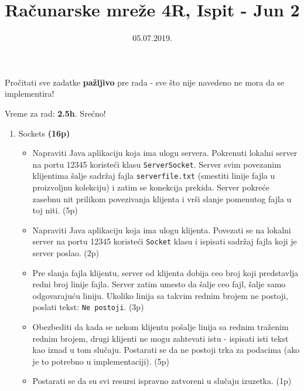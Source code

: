 \documentclass[]{article}
\title{Ra\v{c}unarske mre\v{z}e 4R, Ispit - Jun 2}
\date{05.07.2019.}
\begin{document}
\makeatletter
\begin{center}

{\fontsize{12pt}{14pt}\selectfont\bfseries\@title\par}
\@date

Pro\v{c}itati sve zadatke \textbf{pa\v{z}ljivo} pre rada - sve \v{s}to nije navedeno ne mora da se implementira! 

Vreme za rad: \textbf{2.5h}. Sre\'{c}no!
\end{center}
\makeatother


\begin{enumerate}
  \item Sockets \textbf{(16p)}
  \begin{itemize}
    \item Napraviti Java aplikaciju koja ima ulogu servera. Pokrenuti lokalni server na portu 12345 koriste\'c{}i klasu \texttt{ServerSocket}. Server svim povezanim klijentima \v{s}alje sadr\v{z}aj fajla \texttt{serverfile.txt} (smestiti linije fajla u proizvoljnu kolekciju) i zatim se konekcija prekida. Server pokre\'c{}e zasebnu nit prilikom povezivanja klijenta i vr\v{s}i slanje pomenutog fajla u toj niti. \hfill (5p)
    \item Napraviti Java aplikaciju koja ima ulogu klijenta. Povezati se na lokalni server na portu 12345 koriste\'c{}i \texttt{Socket} klasu i ispisati sadr\v{z}aj fajla koji je server poslao. \hfill (2p)
    \item Pre slanja fajla klijentu, server od klijenta dobija ceo broj koji predstavlja redni broj linije fajla. Server zatim umesto da \v{s}alje ceo fajl, \v{s}alje samo odgovaraju\'{c}u liniju. Ukoliko linija sa takvim rednim brojem ne postoji, poslati tekst: \texttt{Ne postoji}. \hfill (3p)
    \item Obezbediti da kada se nekom klijentu po\v{s}alje linija sa rednim tra\v{z}enim rednim brojem, drugi klijenti ne mogu zahtevati istu - ispisati isti tekst kao iznad u tom slu\v{c}aju. Postarati se da ne postoji trka za podacima (ako je to potrebno u implementaciji). \hfill (5p)
    \item Postarati se da su svi resursi ispravno zatvoreni u slu\v{c}aju izuzetka. \hfill (1p)
  \end{itemize}


\end{enumerate}
\end{document}
